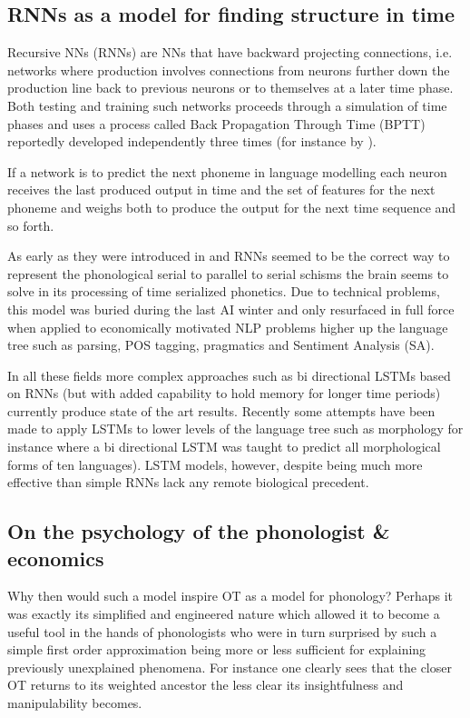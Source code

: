 \documentclass[a4paper,12pt]{article}
\begin{document}
\subsection{RNNs as a model for finding structure in time}

Recursive NNs (RNNs) are NNs that have backward projecting connections, i.e. networks where
production involves connections from neurons further down the production line back to previous
neurons or to themselves at a later time phase. Both testing and training such networks proceeds
through a simulation of time phases and uses a process called Back Propagation Through Time (BPTT)
reportedly developed independently three times (for instance by \cite{mozer_focused_1989}).

If a network is to predict the next phoneme in language modelling each neuron receives the last
produced output in time and the set of features for the next phoneme and weighs both to produce the
output for the next time sequence and so forth.

As early as they were introduced in \cite{elman_finding_1990} and \cite{jordan_serial_1986} RNNs
seemed to be the correct way to represent the phonological serial to parallel to serial schisms the
brain seems to solve in its processing of time serialized phonetics. Due to technical problems,
this model was buried during the last AI winter and only resurfaced in full force when applied to
economically motivated NLP problems higher up the language tree such as parsing, POS tagging,
pragmatics and Sentiment Analysis (SA).

In all these fields more complex approaches such as bi directional LSTMs based on RNNs (but with
added capability to hold memory for longer time periods) currently produce state of the art
results. Recently some attempts have been made to apply LSTMs to lower levels of the language tree
such as morphology for instance where a bi directional LSTM was taught to predict all morphological
forms of ten languages). LSTM models, however, despite being much more effective than simple RNNs
lack any remote biological precedent.

\subsection{On the psychology of the phonologist \& economics}

Why then would such a model inspire OT as a model for phonology? Perhaps it was exactly its
simplified and engineered nature which allowed it to become a useful tool in the hands of
phonologists who were in turn surprised by such a simple first order approximation being more or
less sufficient for explaining previously unexplained phenomena. For instance one clearly sees
that the closer OT returns to its weighted ancestor the less clear its insightfulness and
manipulability becomes.
\end{document}
